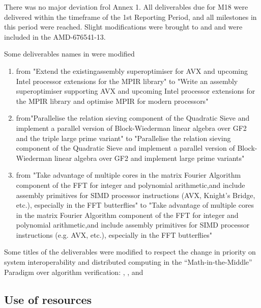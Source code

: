 \documentclass{deliverablereport}
\begin{document}
\begin{itemize}
There was no major deviation frol Annex 1. All deliverables due for M18 were delivered within the timeframe of the 1st Reporting Period, and all milestones in this period were reached.
Slight modifications were brought to  and \WPref{} and were included in the AMD-676541-13.


Some deliverables names in  were modified
\begin{enumerate}
\item {} from "Extend the existingassembly superoptimiser
for AVX and upcoming Intel processor extensions for the MPIR library" to "Write an assembly
superoptimiser supporting AVX and upcoming Intel processor extensions for the MPIR library
and optimise MPIR for modern processors"
\item {} from"Parallelise the relation sieving component of the
Quadratic Sieve and implement a parallel version of Block-Wiederman linear algebra over GF2
and the triple large prime variant" to "Parallelise the relation sieving component of the
Quadratic Sieve and implement a parallel version of Block-Wiederman linear algebra over GF2
and implement large prime variants"
\item {} from "Take advantage of multiple cores in the matrix Fourier Algorithm
component of the FFT for integer and polynomial arithmetic,and include assembly primitives for
SIMD processor instructions (AVX, Knight's Bridge, etc.), especially in the FFT butterflies" to
"Take advantage of multiple cores in the matrix Fourier Algorithm component of the FFT for
integer and polynomial arithmetic,and include assembly primitives for SIMD processor
instructions (e.g. AVX, etc.), especially in the FFT butterflies"
\end{enumerate}

Some titles of the  deliverables were modified to respect the change in
priority on system interoperability and distributed computing in the ``Math-in-the-Middle'' Paradigm over algorithm verification: , , and  


\subsection{Use of resources}


\end{itemize}
\end{document}
